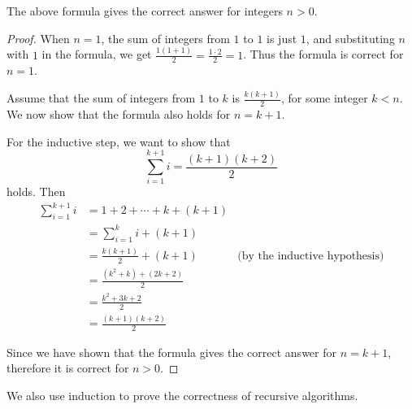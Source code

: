 \begin{claim}
The above formula gives the correct answer for integers $n>0$.
\end{claim}
\begin{proof}
    When $n=1$, the sum of integers from $1$ to $1$ is just $1$, and substituting $n$ with $1$ in the formula, we get $\frac{1\left(1+1\right)}{2} = \frac{1\cdot 2}{2} = 1$. Thus the formula is correct for $n=1$.

    Assume that the sum of integers from $1$ to $k$ is $\frac{k\left(k+1\right)}{2}$, for some integer $k < n$. We now show that the formula also holds for $n = k+1$.

    For the inductive step, we want to show that
\[
    \sum_{i=1}^{k+1} i = \frac{\left(k+1\right) \left(k+2\right)}{2}
\]
holds. Then
    \begin{align*}
        \sum_{i=1}^{k+1} i &= 1 + 2 + \cdots + k + \left(k+1\right) \\
        &= \sum_{i=1}^{k} i + \left(k+1\right) \\
        &= \frac{k\left(k+1\right)}{2} + \left(k+1\right) & \text{(by the inductive hypothesis)} \\
        &= \frac{\left(k^2 + k\right) + \left(2k + 2\right)}{2} \\
        &= \frac{k^2 + 3k + 2}{2} \\
        &= \frac{\left(k+1\right) \left(k+2\right)}{2}
    \end{align*}

    Since we have shown that the formula gives the correct answer for $n = k+1$, therefore it is correct for $n>0$.
\end{proof}

We also use induction to prove the correctness of recursive algorithms.

